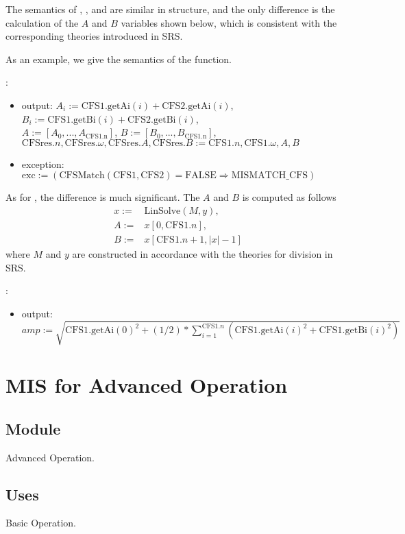 \documentclass[12pt, titlepage]{article}
\begin{document}
The semantics of , , and  are similar in structure, and the only difference is the calculation of the $A$ and $B$ variables shown below, which is consistent with the corresponding theories introduced in SRS.

As an example, we give the semantics of the  function.

\noindent {}:
\begin{itemize}
	\item output: $A_i:=\text{CFS1}.\text{getAi}(i)+\text{CFS2}.\text{getAi}(i)$,
	$B_i:=\text{CFS1}.\text{getBi}(i)+\text{CFS2}.\text{getBi}(i)$,\\
	$A:=[A_0, ..., A_{\text{CFS1.n}}]$, $B:=[B_0, ..., B_{\text{CFS1.n}}]$,\\
	$\text{CFSres}.n, \text{CFSres}.\omega, \text{CFSres}.A, \text{CFSres}.B:=\text{CFS1}.n, \text{CFS1}.\omega, A, B$
	\item exception: $\text{exc}:=(\text{CFSMatch}(\text{CFS1}, \text{CFS2})=\text{FALSE}\Rightarrow\text{MISMATCH\_CFS})$
\end{itemize}

As for , the difference is much significant. The $A$ and $B$ is computed as follows
\begin{align*}
	x:=&\text{LinSolve}(M, y),\\
	A:=&x[0,\text{CFS1}.n],\\
	B:=&x[\text{CFS1}.n+1, |x|-1]
\end{align*}
where $M$ and $y$ are constructed in accordance with the theories for division in SRS.

\noindent {}:
\begin{itemize} 
	\item output: $amp:=\sqrt{\text{CFS1}.\text{getAi}(0)^2+(1/2)*\sum_{i=1}^{\text{CFS1}.n}(\text{CFS1}.\text{getAi}(i)^2+\text{CFS1}.\text{getBi}(i)^2)}$ 
\end{itemize}

\section{MIS for Advanced Operation}
\subsection{Module}
Advanced Operation.
\subsection{Uses}
Basic Operation.
\end{document}
